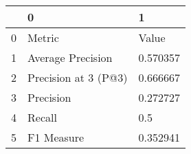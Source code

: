 \begin{tabular}{lll}
\toprule
{} &                     0 &         1 \\
\midrule
0 &                Metric &     Value \\
1 &     Average Precision &  0.570357 \\
2 &  Precision at 3 (P@3) &  0.666667 \\
3 &             Precision &  0.272727 \\
4 &                Recall &       0.5 \\
5 &            F1 Measure &  0.352941 \\
\bottomrule
\end{tabular}
